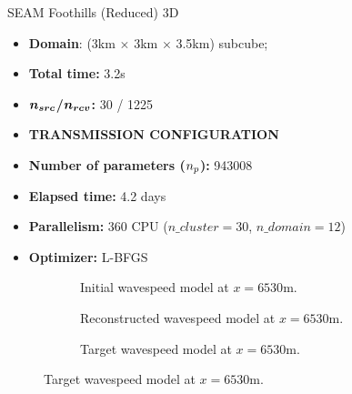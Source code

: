 \begin{frame}[noframenumbering]{SEAM Foothills (Reduced) 3D}

  \vspace{-0.6cm}
   \begin{multicols}{2}

     \begin{itemize}
       \scriptsize
    \item \textbf{Domain}: (3km $\times$ 3km $\times$ 3.5km) subcube;
    \item \textbf{Total time:} 3.2s
    \item \textbf{$\boldsymbol{{n_{src}}}$/$\boldsymbol{{n_{rcv}}}$:} 30 / 1225
    \item \textbf{TRANSMISSION CONFIGURATION}
      \columnbreak
    \item \textbf{Number of parameters (${n_{p}}$):} 943008
    \item \textbf{Elapsed time:} 4.2 days
    \item \textbf{Parallelism:} 360 CPU ($n\_cluster=30$, $n\_domain=12$)
    \item \textbf{Optimizer:} L-BFGS
     \end{itemize}
   \end{multicols}
     \scriptsize
     \setlength{\modelwidth}{4.5cm}

\begin{figure}[!htbp]
\begin{subfigure}{0.3\textwidth}
\renewcommand{\modelfile}{image/seam0_x1}

\caption*{\scriptsize{Initial wavespeed model  at $x=6530$m.}}
\end{subfigure}
\begin{subfigure}{0.3\textwidth}
\renewcommand{\modelfile}{image/seam1_x1}

\caption*{\scriptsize{Reconstructed wavespeed model at $x=6530$m.}}
\end{subfigure}
\begin{subfigure}{0.3\textwidth}
  \vspace{-0.4cm}
\renewcommand{\modelfile}{image/seam2_x1}
\renewcommand{\cmapmin}{2000}
\renewcommand{\cmapmax}{6000}

\vspace{-0.8cm}
\caption*{\scriptsize{Target wavespeed model at $x=6530$m.}}
\end{subfigure}
\end{figure}
\end{frame}



